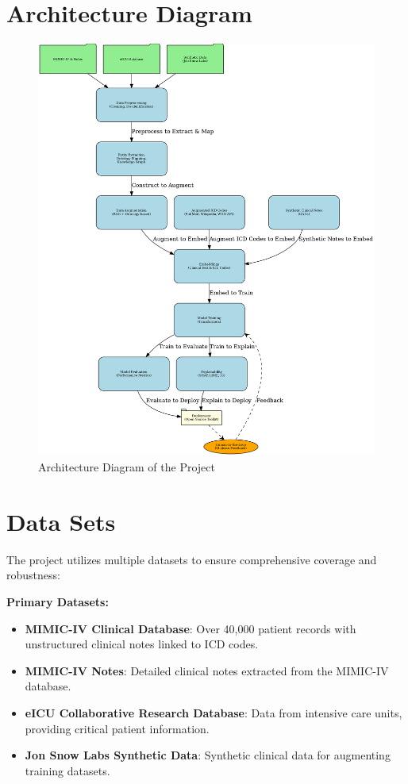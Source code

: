 \documentclass[10pt,a4paper]{article}
\begin{document}
\section{Architecture Diagram}
\begin{figure}[H]
    \centering
    \includegraphics[width=\textwidth]{architecture_diagram_top_down.png}
    \caption{Architecture Diagram of the Project}
\end{figure}

\section{Data Sets}
The project utilizes multiple datasets to ensure comprehensive coverage and robustness:

\textbf{Primary Datasets:}
\begin{itemize}
    \item \textbf{MIMIC-IV Clinical Database}: Over 40,000 patient records with unstructured clinical notes linked to ICD codes.
    \item \textbf{MIMIC-IV Notes}: Detailed clinical notes extracted from the MIMIC-IV database.
    \item \textbf{eICU Collaborative Research Database}: Data from intensive care units, providing critical patient information.
    \item \textbf{Jon Snow Labs Synthetic Data}: Synthetic clinical data for augmenting training datasets.
\end{itemize}
\end{document}

